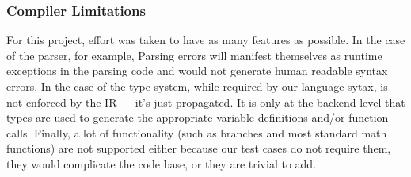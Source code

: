 \subsubsection{Compiler Limitations}

For this project, effort was taken to have as many features as possible.
In the case of the parser, for example, Parsing errors will manifest
  themselves as runtime exceptions in the parsing code and would not
  generate human readable syntax errors.
In the case of the type system, while required by our language sytax,
  is not enforced by the IR --- it's just propagated.
It is only at the backend level that types are used to generate the appropriate
  variable definitions and/or function calls.
Finally, a lot of functionality (such as branches and most standard math functions)
  are not supported either because our test cases do not require them, they would
  complicate the code base, or they are trivial to add.
